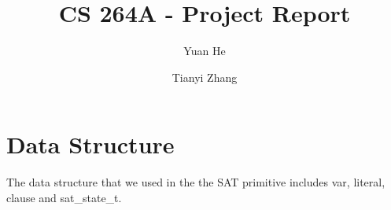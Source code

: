 \documentclass[11pt]{llncs}
\begin{document}
\mainmatter  %

\title{CS 264A - Project Report}


%
%
\author{Yuan He \and Tianyi Zhang}%

%
\institute{}

%
%
\maketitle
\setcounter{page}{1}
\pagestyle{plain}
\section{Data Structure}

The data structure that we used in the the SAT primitive includes var, literal, clause and sat\_state\_t.
\end{document}
